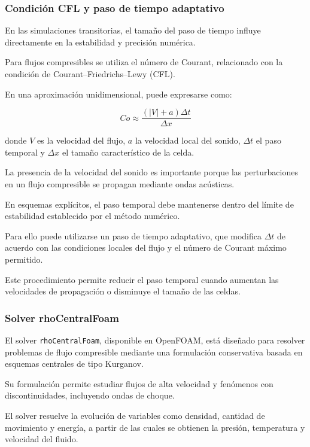 \documentclass[12pt,letterpaper]{article}
\numberwithin{equation}{section}
\begin{document}
\subsubsection{Condición CFL y
paso de tiempo adaptativo}

En las simulaciones transitorias,
el tamaño del paso de tiempo
influye directamente en la
estabilidad y precisión numérica.

Para flujos compresibles se
utiliza el número de Courant,
relacionado con la condición
de Courant--Friedrichs--Lewy (CFL).

En una aproximación unidimensional,
puede expresarse como:

\begin{equation}
Co\approx
\frac{(|V|+a)\Delta t}{\Delta x}
\end{equation}

donde $V$ es la velocidad
del flujo, $a$ la velocidad
local del sonido, $\Delta t$
el paso temporal y $\Delta x$
el tamaño característico
de la celda.

La presencia de la velocidad
del sonido es importante porque
las perturbaciones en un flujo
compresible se propagan mediante
ondas acústicas.

En esquemas explícitos, el
paso temporal debe mantenerse
dentro del límite de estabilidad
establecido por el método numérico.

Para ello puede utilizarse un
paso de tiempo adaptativo,
que modifica $\Delta t$ de
acuerdo con las condiciones
locales del flujo y el número
de Courant máximo permitido.

Este procedimiento permite
reducir el paso temporal cuando
aumentan las velocidades de
propagación o disminuye el
tamaño de las celdas.


\subsubsection{Solver rhoCentralFoam}

El solver \texttt{rhoCentralFoam},
disponible en OpenFOAM, está
diseñado para resolver problemas
de flujo compresible mediante
una formulación conservativa
basada en esquemas centrales
de tipo Kurganov.

Su formulación permite estudiar
flujos de alta velocidad y
fenómenos con discontinuidades,
incluyendo ondas de choque.

El solver resuelve la evolución
de variables como densidad,
cantidad de movimiento y energía,
a partir de las cuales se
obtienen la presión, temperatura
y velocidad del fluido.
\end{document}
